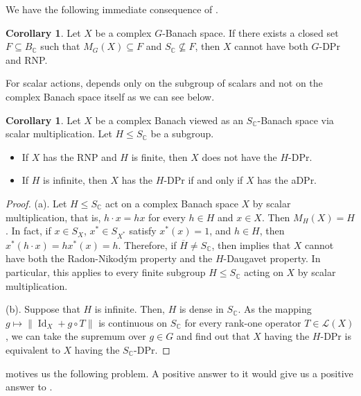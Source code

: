 \documentclass[a4paper,12pt]{amsart}
\theoremstyle{definition}
\newtheorem{corollary}[theorem]{Corollary}
\theoremstyle{definition}
\theoremstyle{remark}
\numberwithin{equation}{section}
\newcommand{\C}{\mathbb{C}}
\DeclareMathOperator{\id}{Id}
\renewcommand{\leq}{\leqslant}
\newcommand{\<}{\langle}
\renewcommand{\>}{\rangle}
\begin{document}
	We have the following immediate consequence of .
	
	\begin{corollary} \label{MG(X)-corollary} Let $X$ be a complex $G$-Banach space. If there exists a closed set $F \subseteq B_{\C}$ such that $M_G(X) \subseteq F$ and $S_{\C}\not\subseteq F$, then $X$ cannot have both $G$-DPr and RNP.
	\end{corollary}
	
	
	For scalar actions,  depends only on the subgroup of scalars and not on the complex Banach space itself as we can see below. 
	
	\begin{corollary} \label{complex-reflexive-aDPr-problem}
		Let $X$ be a complex Banach viewed as an $S_{\C}$-Banach space via scalar multiplication. Let $H \leq S_{\C}$ be a subgroup.
		\begin{itemize}
			\item[(a)] If $X$ has the RNP and $H$ is finite, then $X$ does not have the $H$-DPr.
			\item[(b)] If $H$ is infinite, then $X$ has the $H$-DPr if and only if $X$ has the aDPr.
		\end{itemize}
	\end{corollary}
	
	\begin{proof} (a). Let $H \leq S_{\C}$ act on a complex Banach space $X$ by scalar multiplication, that is, $h\cdot x=hx$ for every $h\in H$ and $x\in X$. Then $M_H(X)=H$. In fact, if $x\in S_X$, $x^*\in S_{X^*}$ satisfy $x^*(x)=1$, and $h\in H$, then $x^*(h\cdot x)=h x^*(x)=h$. Therefore, if $\overline{H}\neq S_{\C}$, then  implies that $X$ cannot have both the Radon-Nikodým property and the $H$-Daugavet property. In particular, this applies to every finite subgroup $H\le S_{\C}$ acting on $X$ by scalar multiplication.
		
		
		\noindent
		(b). Suppose that $H$ is infinite. Then, $H$ is dense in $S_{\C}$. As the mapping $g \mapsto \| \id_X + g \circ T\|$ is continuous on $S_{\C}$ for every rank-one operator $T \in \mathcal{L}(X)$, we can take the supremum over $g \in G$ and find out that $X$ having the $H$-DPr is equivalent to $X$ having the $S_{\C}$-DPr.
	\end{proof}
	
	
	 motives us the following problem. A positive answer to it would give us a positive answer to \cite[Problem 12.6]{KMRW}.
	
\end{document}
